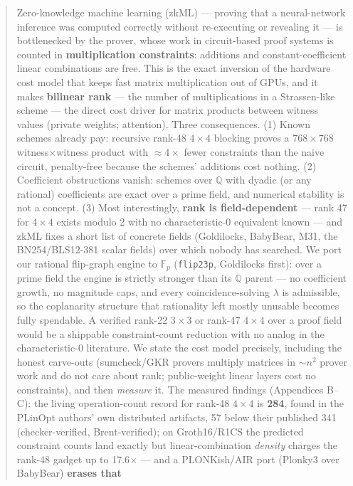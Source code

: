 \documentclass[10pt]{article}
\begin{document}
\begin{abstract}
Zero-knowledge machine learning (zkML) --- proving that a
neural-network inference was computed correctly without re-executing
or revealing it --- is bottlenecked by the prover, whose work in
circuit-based proof systems is counted in \textbf{multiplication
constraints}: additions and constant-coefficient linear combinations
are free. This is the exact inversion of the hardware cost model that
keeps fast matrix multiplication out of GPUs, and it makes
\textbf{bilinear rank} --- the number of multiplications in a
Strassen-like scheme --- the direct cost driver for matrix products
between witness values (private weights; attention). Three
consequences. (1) Known schemes already pay: recursive rank-48
$4\times4$ blocking proves a $768\times768$ witness$\times$witness
product with ${\approx}4\times$ fewer constraints than the naive
circuit, penalty-free because the schemes' additions cost nothing.
(2) Coefficient obstructions vanish: schemes over $\mathbb{Q}$ with
dyadic (or any rational) coefficients are exact over a prime field,
and numerical stability is not a concept. (3) Most interestingly,
\textbf{rank is field-dependent} --- rank 47 for $4\times4$ exists
modulo 2 with no characteristic-0 equivalent known --- and zkML fixes
a short list of concrete fields (Goldilocks, BabyBear, M31, the
BN254/BLS12-381 scalar fields) over which nobody has searched. We
port our rational flip-graph engine to $\mathbb{F}_p$
(\texttt{flip23p}, Goldilocks first): over a prime field the engine
is strictly stronger than its $\mathbb{Q}$ parent --- no coefficient
growth, no magnitude caps, and every coincidence-solving $\lambda$ is
admissible, so the coplanarity structure that rationality left mostly
unusable becomes fully spendable. A verified rank-22 $3\times3$ or
rank-47 $4\times4$ over a proof field would be a shippable
constraint-count reduction with no analog in the characteristic-0
literature. We state the cost model precisely, including the honest
carve-outs (sumcheck/GKR provers multiply matrices in ${\sim}n^2$
prover work and do not care about rank; public-weight linear layers
cost no constraints), and then \emph{measure} it. The measured
findings (Appendices B--C): the living operation-count record for
rank-48 $4\times4$ is \textbf{284}, found in the PLinOpt authors'
own distributed artifacts, 57 below their published 341
(checker-verified, Brent-verified); on Groth16/R1CS the predicted
constraint counts land exactly but linear-combination
\emph{density} charges the rank-48 gadget up to 17.6$\times$ ---
and a PLONKish/AIR port (Plonky3 over BabyBear) \textbf{erases that
}
\end{abstract}
\end{document}

